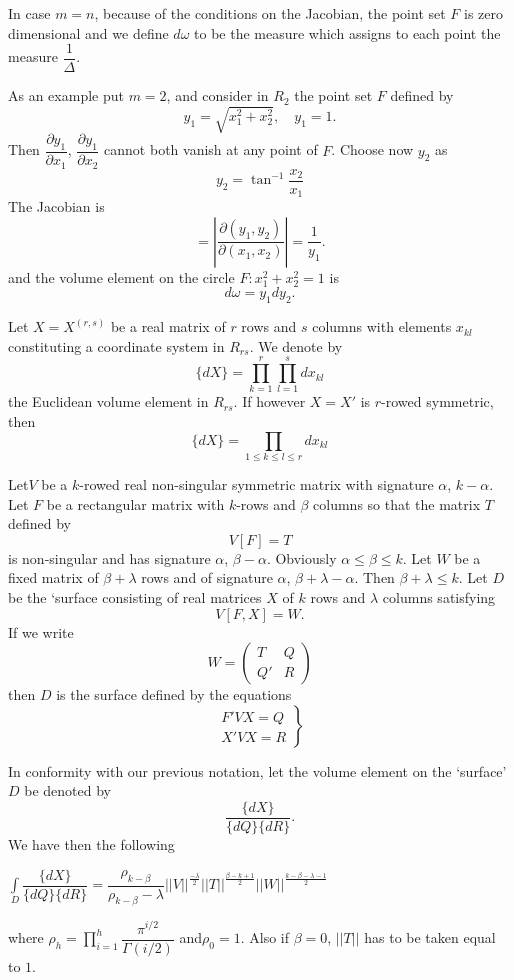 In case $m=n$, because of the conditions on the Jacobian, the point
set $F$ is zero dimensional and we define $d\omega$ to be the measure
which assigns to each point the measure $\dfrac{1}{\Delta}$.

As an example put $m=2$, and consider in $R_{2}$ the point set $F$
defined by
$$
y_{1}=\sqrt{x^{2}_{1}+x^{2}_{2}},\quad y_{1}=1.
$$
Then $\dfrac{\partial y_{1}}{\partial x_{1}}$, $\dfrac{\partial
  y_{1}}{\partial x_{2}}$ cannot both vanish at any point of
$F$. Choose now $y_{2}$ as
$$
y_{2}=\tan^{-1}\dfrac{x_{2}}{x_{1}}
$$
The Jacobian is 
$$
=\left|\frac{\partial (y_{1},y_{2})}{\partial
  (x_{1},x_{2})}\right|=\frac{1}{y_{1}}. 
$$
and the volume element on the circle $F:x^{2}_{1}+x^{2}_{2}=1$ is
$$
d\omega=y_{1}dy_{2}.
$$

Let $X=X^{(r,s)}$ be a real matrix of $r$ rows and $s$ columns with
elements $x_{kl}$ constituting a coordinate system in $R_{rs}$. We
denote by
$$
\{dX\}=\prod^{r}_{k=1}\prod^{s}_{l=1}dx_{kl}
$$
the Euclidean volume element in $R_{rs}$. If however $X=X'$ is
$r$-rowed symmetric, then
$$
\{dX\}=\prod_{1\leq k\leq l\leq r}dx_{kl}
$$

Let\pageoriginale $V$ be a $k$-rowed real non-singular symmetric
matrix with signature $\alpha$, $k-\alpha$. Let $F$ be a rectangular
matrix with $k$-rows and $\beta$ columns so that the matrix $T$
defined by
$$
V[F]=T
$$
is non-singular and has signature $\alpha$, $\beta-\alpha$. Obviously
$\alpha\leq \beta\leq k$. Let $W$ be a fixed matrix of $\beta+\lambda$
rows and of signature $\alpha$, $\beta+\lambda-\alpha$. Then
$\beta+\lambda\leq k$. Let $D$ be the `surface consisting of real
matrices $X$ of $k$ rows and $\lambda$ columns satisfying
$$
V[F,X]=W.
$$
If we write
$$
W=
\begin{pmatrix}
T & Q\\
Q' & R
\end{pmatrix}
$$
then $D$ is the surface defined by the equations
\begin{equation*}
\left.
\begin{aligned}
F'VX=Q\\
X'VX=R
\end{aligned}
\right\}\tag{88}\label{c4:eq88}
\end{equation*}

In conformity with our previous notation, let the volume element on
the `surface' $D$ be denoted by
$$
\frac{\{dX\}}{\{dQ\}\{dR\}}.
$$
We have then the following

\begin{thm}\label{chap4:thm6}
$\int\limits_{D} \dfrac{\{dX\}}{\{dQ\}\{dR\}} =
  \dfrac{\rho_{k-\beta}}{\rho_{k-\beta}-\lambda}
||V||^{\frac{-\lambda}{2}} ||T||^{\frac{\beta-k+1}{2}}
||W||^{\frac{k-\beta-\lambda-1}{2}}$   

\medskip
\noindent
  where
  $\rho_{h}=\prod\limits^{h}_{i=1}\dfrac{\pi^{i/2}}{\Gamma(i/2)}$
  and\pageoriginale $\rho_{0}=1$. Also if $\beta=0$, $||T||$ has to be
  taken equal to $1$. 
\end{thm}

